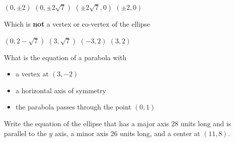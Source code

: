 \documentclass[11pt,answers]{exam}
\begin{document}
\begin{questions}
\begin{minipage}{\linewidth}
\begin{choices}
	\choice $(0, \pm 2)$
	\choice $(0, \pm 2\sqrt7)$
	\CorrectChoice $(\pm 2\sqrt7,0)$
	\choice $(\pm 2,0)$
\end{choices} \answerline
\vspace{0.5in}
\end{minipage}
\begin{minipage}{\linewidth}
\question[3]  Which is \textbf{not} a vertex or co-vertex of the ellipse 

\begin{choices}
	\choice $(0,2-\sqrt{7})$
	\CorrectChoice $(3,\sqrt{7})$
	\choice $(-3,2)$
	\choice $(3,2)$
\end{choices} \answerline
\vspace{0.5in}


\end{minipage}
\begin{minipage}{\linewidth}
\question[3] What is the equation of a parabola with
\begin{itemize}
	\item a vertex
 at $(3, -2)$
 \item a horizontal axis of symmetry
 \item the parabola passes through the point $(0, 1)$
\end{itemize}

 \begin{choices}
\choice {}
\choice {}
\CorrectChoice {}
\choice {}
\choice {}
\end{choices} \answerline
\vspace{0.5in}


\end{minipage}
\begin{minipage}{\linewidth}
\question[3] Write the equation of the ellipse that has a major axis 28 units long and is parallel to the $y$ axis,
 a minor axis 26 units long, and a center at $(11, 8)$.
 \vspace{1ex}


\end{minipage}
\end{questions}
\end{document}
